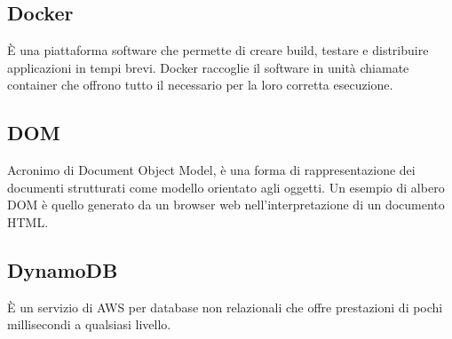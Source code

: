 \subsection{Docker}
È una piattaforma software che permette di creare build, testare e distribuire applicazioni in tempi brevi. Docker raccoglie il software in unità chiamate container che offrono tutto il necessario per la loro corretta esecuzione.

\subsection{DOM}
Acronimo di Document Object Model,  è una forma di rappresentazione dei documenti strutturati come modello orientato agli oggetti. Un esempio di albero DOM è quello generato da un browser web nell'interpretazione di un documento HTML.

\subsection{DynamoDB}
È un servizio di AWS per database non relazionali che offre prestazioni di pochi millisecondi a qualsiasi livello.
